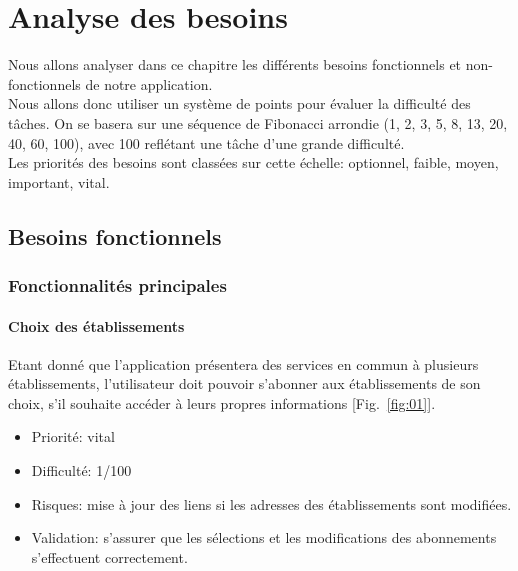 \documentclass [pdftex,12pt] {report}
\begin{document}
\chapter{Analyse des besoins}

Nous allons analyser dans ce chapitre les différents besoins fonctionnels et non-fonctionnels de notre application.\\
Nous allons donc utiliser un système de points pour évaluer la difficulté des tâches. On se basera sur une séquence de Fibonacci arrondie (1, 2, 3, 5, 8, 13, 20, 40, 60, 100), avec 100 reflétant une tâche d'une grande difficulté.\\
Les priorités des besoins sont classées sur cette échelle: optionnel, faible, moyen, important, vital.
\section{Besoins fonctionnels}
\subsection{Fonctionnalités principales}
\subsubsection{Choix des établissements}
Etant donné que l'application présentera des services en commun à plusieurs établissements, l'utilisateur doit pouvoir s'abonner aux établissements de son choix, s'il souhaite accéder à leurs propres informations [Fig.~\ref{fig:01}]. \\

\begin{itemize}
\renewcommand{\labelitemi}{$\bullet$}
\item Priorité: vital
\item Difficulté: 1/100
\item Risques: mise à jour des liens si les adresses des établissements sont modifiées.
\item Validation: s'assurer que les sélections et les modifications des abonnements s'effectuent correctement.
\end{itemize}
\end{document}

